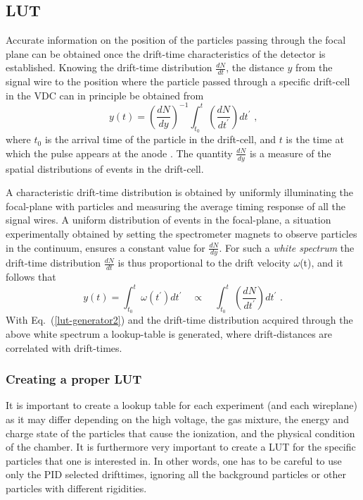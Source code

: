 \documentclass[11pt]{report}
\begin{document}
\subsection{LUT}\label{sec:newdatLUT}


Accurate information on the position of the particles passing through the focal
plane can be obtained once the drift-time characteristics of the detector is established. 
Knowing the drift-time distribution $\frac{dN}{dt}$, the
distance $y$ from the signal wire to the position where the particle passed through a 
specific drift-cell in the VDC can in principle be obtained from 
\begin{equation}
y(t)=(\frac{dN}{dy})^{-1} \int_{t_{0}}^{t}
\left( \frac{dN}{dt^{\prime }} \right) dt^{\prime }
\textrm{ ,}  
\label{lut-generator}
\end{equation} 
where $t_{0}$ is the arrival time of the particle in the drift-cell, and 
$t$ is the time at which  the pulse appears at the anode \cite{Ber77}.
The quantity $\frac{dN}{dy}$ is a measure of the spatial distributions 
of events in the drift-cell.

A characteristic drift-time distribution is obtained by uniformly 
illuminating the focal-plane with particles and measuring the
average timing response of all the signal wires. 
A uniform distribution of events in the focal-plane,
a situation experimentally obtained by setting the spectrometer magnets to observe particles
in the continuum, ensures a constant value for $\frac{dN}{dy}$.
For such a {\it white spectrum} the drift-time distribution $\frac{dN}{dt}$
is thus proportional to the drift velocity $\omega$(t), and it
follows that 
\begin{equation}
y(t)=\int_{t_{0}}^{t} \omega(t^{\prime}) dt^{\prime }
\quad  \propto  \quad \int_{t_{0}}^{t}
\left( \frac{dN}{dt^{\prime }} \right) dt^{\prime }
\textrm{ .}  
\label{lut-generator2}
\end{equation} 
With Eq.~(\ref{lut-generator2}) and the drift-time distribution
acquired through the above white spectrum a lookup-table is generated, 
where drift-distances are correlated with drift-times.

\subsubsection{Creating a proper LUT}\label{sec:LUTcreation}

It is important to create a lookup table for each experiment (and each wireplane)
as it may differ depending on the high voltage, the gas mixture, the energy and charge state of the particles
that cause the ionization, and the physical condition of the chamber.  
It is furthermore very important to create a LUT for the specific particles 
that one is interested in. 
In other words, one has to be careful to use only the PID selected drifttimes,
ignoring all the background particles or other particles with different rigidities.
\end{document}
